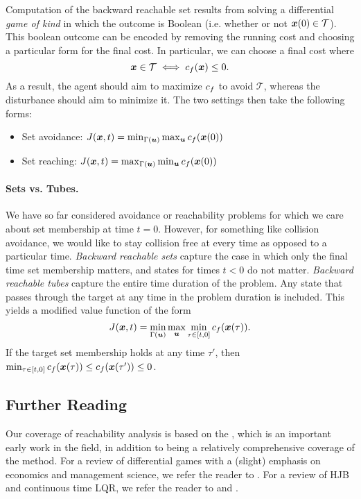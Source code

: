 Computation of the backward reachable set results from solving a differential \textit{game of kind} in which the outcome is Boolean (i.e. whether or not $\bm{x}(0) \in \mathcal{T}$). This boolean outcome can be encoded by removing the running cost and choosing a particular form for the final cost. In particular, we can choose a final cost where
\begin{equation}
    \bm{x} \in \mathcal{T} \iff c_f(\bm{x}) \leq 0.
\end{equation}
As a result, the agent should aim to maximize $c_f$ to avoid $\mathcal{T}$, whereas the disturbance should aim to minimize it. The two settings then take the following forms:
\begin{itemize}
    \item Set avoidance: $J(\bm{x},t) = \min_{\Gamma(\bm{u})} \max_{\bm{u}} c_f(\bm{x}(0))$
    \item Set reaching: $J(\bm{x},t) = \max_{\Gamma(\bm{u})} \min_{\bm{u}} c_f(\bm{x}(0))$
\end{itemize}

\paragraph{Sets vs. Tubes.} We have so far considered avoidance or reachability problems for which we care about set membership at time $t=0$. However, for something like collision avoidance, we would like to stay collision free at every time as opposed to a particular time. \textit{Backward reachable sets} capture the case in which only the final time set membership matters, and states for times $t<0$ do not matter. \textit{Backward reachable tubes} capture the entire time duration of the problem. Any state that passes through the target at any time in the problem duration is included. This yields a modified value function of the form
\begin{equation}
    J(\bm{x},t) = \min_{\Gamma(\bm{u})} \max_{\bm{u}} \min_{\tau \in [t,0]} c_f(\bm{x}(\tau)).
\end{equation}
If the target set membership holds at any time $\tau'$, then $\min_{\tau\in[t,0]} c_f(\bm{x}(\tau)) \leq c_f(\bm{x}(\tau')) \leq 0$.

\subsection{Further Reading}

Our coverage of reachability analysis is based on the \cite{mitchell2005time}, which is an important early work in the field, in addition to being a relatively comprehensive coverage of the method. For a review of differential games with a (slight) emphasis on economics and management science, we refer the reader to \cite{bressan2010noncooperative}. For a review of HJB and continuous time LQR, we refer the reader to \cite{bertsekas1995dynamic} and \cite{kirk2012optimal}.

